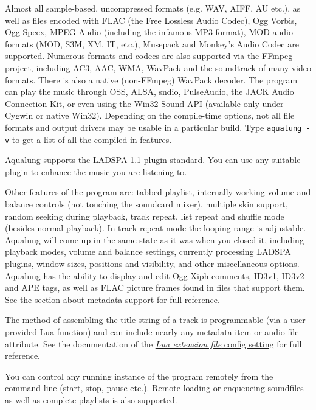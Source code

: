 \documentclass[10pt,english]{article}
\begin{document}
Almost all sample-based, uncompressed formats (e.g. WAV,
AIFF, AU etc.), as well as files encoded with FLAC (the Free
Lossless Audio Codec), Ogg Vorbis, Ogg Speex, MPEG Audio
(including the infamous MP3 format), MOD audio formats (MOD,
S3M, XM, IT, etc.), Musepack and Monkey's Audio Codec are
supported. Numerous formats and codecs are also supported via
the FFmpeg project, including AC3, AAC, WMA, WavPack and the
soundtrack of many video formats. There is also a native
(non-FFmpeg) WavPack decoder. The program can play the music
through OSS, ALSA, sndio, PulseAudio, the JACK Audio Connection
Kit, or even using the Win32 Sound API (available only under
Cygwin or native Win32). Depending on the compile-time options,
not all file formats and output drivers may be usable in a
particular build. Type \texttt{aqualung -v} to get a list of
all the compiled-in features.




Aqualung supports the LADSPA 1.1 plugin standard. You can use
any suitable plugin to enhance the music you are listening
to.




Other features of the program are: tabbed playlist,
internally working volume and balance controls (not touching the
soundcard mixer), multiple skin support, random seeking during
playback, track repeat, list repeat and shuffle mode (besides
normal playback). In track repeat mode the looping range is
adjustable. Aqualung will come up in the same state as it was
when you closed it, including playback modes, volume and balance
settings, currently processing LADSPA plugins, window sizes,
positions and visibility, and other miscellaneous
options. Aqualung has the ability to display and edit Ogg Xiph
comments, ID3v1, ID3v2 and APE tags, as well as FLAC picture
frames found in files that support them. See the section about
\hyperref[idp695360]{\color{blue}metadata support} for full reference.




The method of assembling the title string of a track is programmable
(via a user-provided Lua function) and can include nearly any metadata
item or audio file attribute. See the documentation of the
\hyperref[idp808416]{\color{blue}\textsl{Lua extension file}
config setting} for full reference.




You can control any running instance of the program remotely
from the command line (start, stop, pause etc.). Remote loading
or enqueueing soundfiles as well as complete playlists is also
supported.
\end{document}
